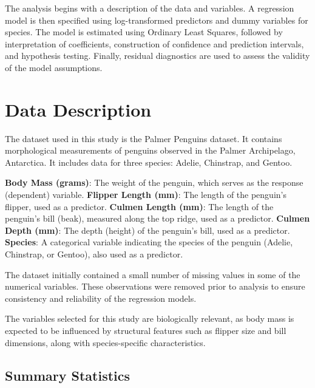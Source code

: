 \documentclass[12pt]{article}
\begin{document}
The analysis begins with a description of the data and
variables. A regression model is then specified using
log-transformed predictors and dummy variables for species.
The model is estimated using Ordinary Least Squares, followed
by interpretation of coefficients, construction of
confidence and prediction intervals, and hypothesis testing.
Finally, residual diagnostics are used to assess the
validity of the model assumptions.

\section{Data Description}

The dataset used in this study is the
Palmer Penguins dataset.
It contains morphological measurements of
penguins observed in the
Palmer Archipelago, Antarctica.
It includes data for three species:
Adelie, Chinstrap, and Gentoo.

\begin{itemize}
    \ii \textbf{Body Mass (grams)}:
    The weight of the penguin,
    which serves as the response (dependent) variable.
    \ii \textbf{Flipper Length (mm)}:
    The length of the penguin’s flipper, used as a predictor.
    \ii \textbf{Culmen Length (mm)}:
    The length of the penguin’s bill (beak),
    measured along the top ridge,
    used as a predictor.
    \ii \textbf{Culmen Depth (mm)}:
    The depth (height) of the penguin’s bill,
    used as a predictor.
    \ii \textbf{Species}:
    A categorical variable indicating the
    species of the penguin
    (Adelie, Chinstrap, or Gentoo),
    also used as a predictor.
\end{itemize}

The dataset initially contained a small number of
missing values in some of the numerical variables.
These observations were removed prior to analysis to
ensure consistency and reliability of the
regression models.

The variables selected for this study are
biologically relevant, as body mass is expected to be
influenced by structural features such as flipper size
and bill dimensions,
along with species-specific characteristics.

\subsection{Summary Statistics}
\end{document}

